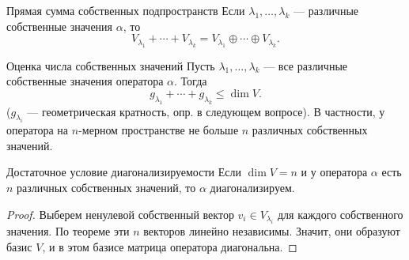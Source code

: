 \begin{Corollary}{Прямая сумма собственных подпространств}{}
	Если $\lambda_1,\ldots,\lambda_k$ --- различные собственные значения $\alpha$, то
	\[
	V_{\lambda_1}+\cdots+V_{\lambda_k}
	=
	V_{\lambda_1}\oplus\cdots\oplus V_{\lambda_k}.
	\]
\end{Corollary}

\begin{Corollary}{Оценка числа собственных значений}{}
	Пусть $\lambda_1,\ldots,\lambda_k$ --- все различные собственные значения оператора $\alpha$.
	Тогда
	\[
	g_{\lambda_1}+\cdots+g_{\lambda_k}\le \dim V.  
	\]
	($g_{\lambda_i}$  --- геометрическая кратность, опр. в следующем вопросе). В частности, у оператора на $n$-мерном пространстве не больше $n$ различных собственных значений.
\end{Corollary}

\begin{Corollary}{Достаточное условие диагонализируемости}{}
	Если $\dim V=n$ и у оператора $\alpha$ есть $n$ различных собственных значений, то $\alpha$ диагонализируем.
\end{Corollary}

\begin{proof}
	Выберем ненулевой собственный вектор $v_i\in V_{\lambda_i}$ для каждого собственного значения.
	По теореме эти $n$ векторов линейно независимы.
	Значит, они образуют базис $V$, и в этом базисе матрица оператора диагональна.
\end{proof}